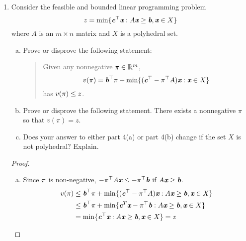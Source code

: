 \begin{enumerate}
	\newpage
	\item Consider the feasible and bounded linear programming problem
	$$z = \min\{\bc^\top\bx : A\bx \ge \bb, \bx \in X\}$$
	where $A$ is an $m \times n$ matrix and $X$ is a polyhedral set.
	\begin{enumerate}[(a)]
		\item Prove or disprove the following statement:
		\begin{quote}
			Given any nonnegative $\bpi \in \mathbb{R}^m$,
			$$v(\bpi) = \bb^\top\bpi + \min\{(\bc^\top-\bpi^\top A)\bx : \bx \in X\}$$
			has $v(\bpi) \le z$.
		\end{quote}
	
		\item  Prove or disprove the following statement.
		There exists a nonnegative $\pi$ so that $v(\pi) = z$.
		\item  Does your answer to either part 4(a) or part 4(b) change if the set $X$ is not polyhedral?
		Explain.
	\end{enumerate}
	
	\begin{proof}
		\begin{enumerate}[(a)]
			\item Since $\bpi$ is non-negative, $-\bpi^\top A\bx \le -\bpi^\top \bb$ if $A\bx\ge \bb$.
			\[
			\begin{aligned}
			v(\bpi) &\le \bb^\top\bpi +\min \{(\bc^\top-\bpi^\top A)\bx: A\bx\ge \bb, \bx \in X\}\\ 
			&\le \bb^\top\pi + \min \{\bc^T\bx-\bpi^\top\bb: A\bx\ge \bb, \bx \in X\}
			\\&=\min \{\bc^\top\bx: A\bx\ge \bb, \bx \in X\} = z
			\end{aligned}
			\]
			

\end{enumerate}
\end{proof}
\end{enumerate}
